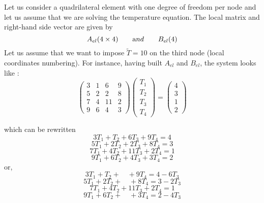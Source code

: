 
Let us consider a quadrilateral element with one degree of freedom per node and let us assume that we are solving the temperature equation. The local matrix and right-hand side vector are given by 
\[
A_{el}(4\times 4) \quad\quad {\text and} \quad\quad B_{el}(4)
\]
Let us assume that we want to impose $\tilde{T}=10$ on the third node (local coordinates numbering). For instance, having built $A_{el}$ and $B_{el}$, the system looks like :
\[
\left(
\begin{array}{cccc}
3 & 1 & 6  & 9 \\
5 & 2 & 2  & 8 \\
7 & 4 & 11 & 2 \\
9 & 6 & 4  & 3
\end{array}
\right)
\left(
\begin{array}{c}
T_1 \\ T_2 \\ T_3 \\ T_4
\end{array}
\right)
=
\left(
\begin{array}{c}
4 \\ 3 \\ 1 \\ 2
\end{array}
\right)
\]



which can be rewritten 
\[
3 T_1 + T_2 + 6 T_3 + 9 T_4 = 4
\]
\[
5 T_1 + 2T_2 + 2 T_3 + 8 T_4 = 3
\]
\[
7 T_1 + 4T_2 + 11 T_3 + 2 T_4 = 1
\]
\[
9 T_1 + 6T_2 + 4 T_3 + 3 T_4 = 2
\]
or, 
\[
3 T_1 + T_2 + \quad  + 9 T_4 = 4 - 6T_3
\]
\[
5 T_1 + 2T_2 + \quad + 8 T_4 = 3 - 2T_3
\]
\[
7 T_1 + 4T_2 + 11T_3 + 2 T_4 = 1 
\]
\[
9 T_1 + 6T_2 + \quad + 3 T_4 = 2 - 4T_3
\]



